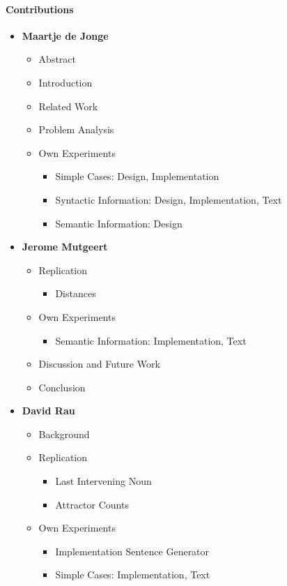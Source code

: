 \paragraph{Contributions}

\begin{itemize}
  \item \textbf{Maartje de Jonge}
  \begin{itemize}
    \item Abstract
    \item Introduction
    \item Related Work
    \item Problem Analysis
    \item Own Experiments
    \begin{itemize}
       \item Simple Cases: Design, Implementation
       \item Syntactic Information: Design, Implementation, Text
       \item Semantic Information: Design
    \end{itemize}        
  \end{itemize}

  \item \textbf{Jerome Mutgeert}
   \begin{itemize}
      \item Replication
      \begin{itemize}
         \item Distances
      \end{itemize}
    \item Own Experiments
    \begin{itemize}
       \item Semantic Information: Implementation, Text
    \end{itemize}        
    \item Discussion and Future Work
    \item Conclusion
   \end{itemize}

  \item \textbf{David Rau}
    \begin{itemize}
      \item Background
      \item Replication
      \begin{itemize}
         \item Last Intervening Noun
         \item Attractor Counts
      \end{itemize}
    \item Own Experiments
    \begin{itemize}
       \item Implementation Sentence Generator
       \item Simple Cases: Implementation, Text
    \end{itemize}        
  \end{itemize}

\end{itemize}


